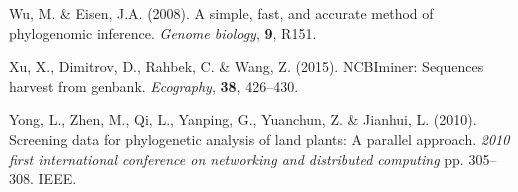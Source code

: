 \documentclass[]{article}
\begin{document}
\leavevmode\hypertarget{ref-wu2008simple}{}%
Wu, M. \& Eisen, J.A. (2008). A simple, fast, and accurate method of phylogenomic inference. \emph{Genome biology}, \textbf{9}, R151.

\leavevmode\hypertarget{ref-xu2015ncbiminer}{}%
Xu, X., Dimitrov, D., Rahbek, C. \& Wang, Z. (2015). NCBIminer: Sequences harvest from genbank. \emph{Ecography}, \textbf{38}, 426--430.

\leavevmode\hypertarget{ref-yong2010screening}{}%
Yong, L., Zhen, M., Qi, L., Yanping, G., Yuanchun, Z. \& Jianhui, L. (2010). Screening data for phylogenetic analysis of land plants: A parallel approach. \emph{2010 first international conference on networking and distributed computing} pp. 305--308. IEEE.
\end{document}
